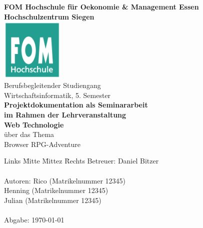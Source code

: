 \documentclass[12pt,oneside,titlepage]{scrartcl}
\newcommand{\myAutor}{Rico  (Matrikelnummer 12345)\\ \> \> \> 
Henning   (Matrikelnummer 12345)\\ \> \> \> 
Julian  (Matrikelnummer 12345)} %
\newcommand{\myAdresse}{Stra\ss e 123 \\ \> \> \> 57xxx Siegerland} %
\newcommand{\myTitel}{Browser RPG-Adventure} %
\newcommand{\myBetreuer}{Daniel Bitzer} %
\newcommand{\myLehrveranstaltung}{Web Technologie} %
\newcommand{\myMatrikelNr}{123456} %
\newcommand{\myAbgabeDatum}{\today} %
\newcommand{\mySemesterZahl}{5} %
\newcommand{\myHochschulName}{FOM Hochschule für Oekonomie \& Management Essen} %
\newcommand{\myHochschulStandort}{Siegen} %
\newcommand{\myStudiengang}{Wirtschaftsinformatik} %
\newcommand{\myThesisArt}{Projektdokumentation als Seminararbeit} %
\newcommand{\myAkademischerGrad}{Bachelor of Science (B. Sc.)} %
\begin{document}

\renewcommand{\refname}{Literaturverzeichnis}		%

\begin{titlepage} %
	\begin{center}
		\textbf{\myHochschulName}\\
		\textbf{Hochschulzentrum \myHochschulStandort}\\
		\vspace{1.5cm}
			\includegraphics[width=3cm]{media/fomLogo} \\
		\vspace{1.5cm}
		Berufsbegleitender Studiengang\\
		\myStudiengang, \mySemesterZahl. Semester\\
		\vspace{2cm}
		\textbf{\myThesisArt}\\
		\textbf{im Rahmen der Lehrveranstaltung}\\
		\textbf{\myLehrveranstaltung}\\
		\vspace{2cm}
		über das Thema\\
		\Large{\myTitel}\\
		\vspace{0.2cm}
	\end{center}
	\normalsize
	\vfill
	\begin{tabbing}
		Links \= Mitte \=Mittez \= Rechts\kill
		Betreuer: \> \> \>\myBetreuer\\
		\> \> \\
		Autoren: \> \> \> \myAutor\\
		\> \> \>  \\
		Abgabe: \> \> \> \myAbgabeDatum
	\end{tabbing}
\end{titlepage}
\end{document}
